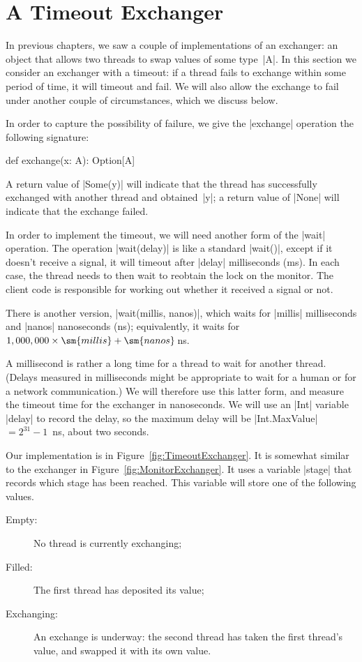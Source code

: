 \section{A Timeout Exchanger}

In previous chapters, we saw a couple of implementations of an exchanger: an
object that allows two threads to swap values of some type~|A|.  In this
section we consider an exchanger with a timeout: if a thread fails to exchange
within some period of time, it will timeout and fail.  We will also allow the
exchange to fail under another couple of circumstances, which we discuss below.

In order to capture the possibility of failure, we give the |exchange|
operation the following signature:
%
\begin{scala}
  def exchange(x: A): Option[A]
\end{scala}
% 
A return value of |Some(y)| will indicate that the thread has successfully
exchanged with another thread and obtained~|y|; a return value of |None| will
indicate that the exchange failed. 

In order to implement the timeout, we will need another form of the |wait|
operation.  The operation |wait(delay)| is like a standard |wait()|, except if
it doesn't receive a signal, it will timeout after |delay| milliseconds (ms).
In each case, the thread needs to then wait to reobtain the lock on the
monitor.  The client code is responsible for working out whether it received a
signal or not.

There is another version, |wait(millis, nanos)|, which waits for |millis|
milliseconds and |nanos| nanoseconds (ns); equivalently, it waits for
$1,000,000 \times \sm{millis} + \sm{nanos}$\,ns.  

A millisecond is rather a long time for a thread to wait for another thread.
(Delays measured in milliseconds might be appropriate to wait for a human or
for a network communication.)  We will therefore use this latter form, and
measure the timeout time for the exchanger in nanoseconds.  We will use an
|Int| variable |delay| to record the delay, so the maximum delay will be
|Int.MaxValue| $= 2^{31}-1$\, ns, about two seconds.

Our implementation is in Figure~\ref{fig:TimeoutExchanger}.  It is somewhat
similar to the exchanger in Figure~\ref{fig:MonitorExchanger}.  It uses a
variable |stage| that records which stage has been reached.  This variable
will store one of the following values.
%
\begin{description}
\item[{\scalastyle Empty}:] No thread is currently exchanging;

\item[{\scalashape Filled}:] The first thread has deposited its value;

\item[{\scalashape Exchanging}:] An exchange is underway: the second thread
  has taken the first thread's value, and swapped it with its own value.
\end{description}


